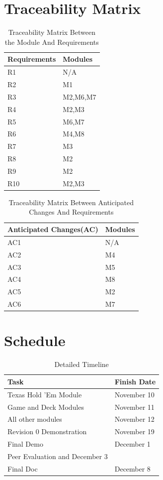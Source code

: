 \documentclass[11pt]{article}
\begin{document}
    \section{Traceability Matrix}
    \begin{table}[h]
    \caption{Traceability Matrix Between the Module And Requirements}
    \begin{tabular}{p{4cm}p{2cm}}
    Requirements & Modules\\
    \hline
    R1 & N/A\\
    \hline
    R2 & M1\\
    \hline
    R3 & M2,M6,M7\\
    \hline
    R4 & M2,M3\\
    \hline
    R5 & M6,M7\\
    \hline
    R6 & M4,M8\\
    \hline
    R7 & M3\\
    \hline
    R8 & M2\\
    \hline
    R9 & M2\\
    \hline
    R10 & M2,M3\\
    \hline
    \end{tabular}
    \end{table}
    
    \begin{table}[h]
    \caption{Traceability Matrix Between Anticipated Changes And Requirements}
    \begin{tabular}{p{4cm}p{2cm}}
    Anticipated Changes(AC) & Modules\\
    \hline
    AC1 & N/A\\
    \hline
    AC2 & M4\\
    \hline
    AC3 & M5\\
    \hline
    AC4 & M8\\
    \hline
    AC5 & M2\\
    \hline
    AC6 & M7\\
    \hline
    \end{tabular}
    \end{table}
    \newpage
    \newpage
    \section{Schedule}
     \begin{table}[h]
    \caption{Detailed Timeline}
    \begin{tabular}{p{5cm}p{7cm}}
    Task & Finish Date\\
    \hline
    Texas Hold 'Em Module & November 10\\
    \hline
    Game and Deck Modules & November 11\\
    \hline
    All other modules & November 12\\
    \hline
    Revision 0 Demonstration & November 19\\
    \hline
    Final Demo & December 1\\
    \hline
    Peer Evaluation and December 3\\
    \hline
    Final Doc & December 8\\
    \hline
    \end{tabular}
    \end{table}
    
\end{document}
